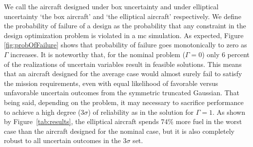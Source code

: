 We call the aircraft designed under box uncertainty and under elliptical uncertainty `the box aircraft'
and `the elliptical aircraft' respectively. We
define the probability of failure of a design as the probability that any constraint
in the design optimization problem is violated in a \gls{mc} simulation.
As expected, Figure \ref{fig:probOfFailure} shows that probability of failure goes monotonically
to zero as $\Gamma$ increases.
It is noteworthy that, for the nominal problem ($\Gamma = 0$) only 6 percent of the realizations of
uncertain variables result in feasible solutions.
This means that an aircraft designed for the average case would almost surely
fail to satisfy the mission requirements, even with equal likelihood of favorable versus
unfavorable uncertain outcomes from the symmetric truncated Gaussian.
That being said, depending on the problem, it may necessary to sacrifice
performance to achieve a high degree ($3\sigma$) of
reliability as in the solution for $\Gamma = 1$. As shown by Figure~\ref{tab:results},
the elliptical aircraft spends 74\% more fuel
in the worst case than the aircraft designed for the nominal case, but it
is also completely robust to all uncertain outcomes in the $3\sigma$ set.

